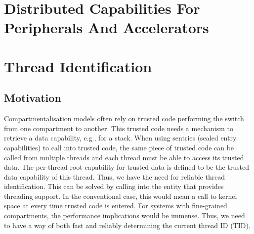 \section{Distributed Capabilities For Peripherals And Accelerators} %
\label{app:exp:peripherals}




% 
% 
% 
% 
% 
% 
% 
% 
% 
% 



\section{Thread Identification} %

\subsection{Motivation}

Compartmentalisation models often rely on trusted code performing the switch from one compartment to another.
This trusted code needs a mechanism to retrieve a data capability, e.g., for a stack.
When using sentries (sealed entry capabilities) to call into trusted code, the same piece of trusted code can be called from multiple threads and each thread must be able to access its trusted data.
The per-thread root capability for trusted data is defined to be the trusted data capability of this thread.
Thus, we have the need for reliable thread identification.
This can be solved by calling into the entity that provides threading support.
In the conventional case, this would mean a call to kernel space at every time trusted code is entered.
For systems with fine-grained compartments, the performance implications would be immense.
Thus, we need to have a way of both fast and reliably determining the current thread ID (TID).

